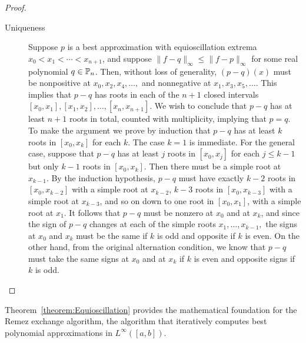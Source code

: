 \begin{proof}
\begin{description}
\item[Uniqueness] Suppose $p$ is a best approximation with equioscillation extrema $x_0<x_1<\cdots<x_{n+1}$, and suppose $\|f-q\|_\infty \le \|f-p\|_\infty$ for some real polynomial $q\in\P_n$. Then, without loss of generality, $(p-q)(x)$ must be nonpositive at $x_0,x_2,x_4,\ldots,$ and nonnegative at $x_1,x_3,x_5,\ldots.$ This implies that $p-q$ has roots in each of the $n+1$ closed intervals $[x_0,x_1], [x_1,x_2],\ldots,[x_n,x_{n+1}]$. We wish to conclude that $p-q$ has at least $n+1$ roots in total, counted with multiplicity, implying that $p=q$. To make the argument we prove by induction that $p-q$ has at least $k$ roots in $[x_0,x_k]$ for each $k$. The case $k=1$ is immediate. For the general case, suppose that $p-q$ has at least $j$ roots in $[x_0,x_j]$ for each $j\le k-1$ but only $k-1$ roots in $[x_0,x_k]$. Then there must be a simple root at $x_{k-1}$. By the induction hypothesis, $p-q$ must have exactly $k-2$ roots in $[x_0,x_{k-2}]$ with a simple root at $x_{k-2}$, $k-3$ roots in $[x_0,x_{k-3}]$ with a simple root at $x_{k-3}$, and so on down to one root in $[x_0,x_1]$, with a simple root at $x_1$. It follows that $p-q$ must be nonzero at $x_0$ and at $x_k$, and since the sign of $p-q$ changes at each of the simple roots $x_1,\ldots,x_{k-1},$ the signs at $x_0$ and $x_k$ must be the same if $k$ is odd and opposite if $k$ is even. On the other hand, from the original alternation condition, we know that $p-q$ must take the same signs at $x_0$ and at $x_k$ if $k$ is even and opposite signs if $k$ is odd.
\end{description}
\end{proof}

Theorem~\ref{theorem:Equioscillation} provides the mathematical foundation for the Remez exchange algorithm, the algorithm that iteratively computes best polynomial approximations in $L^\infty([a,b])$.

